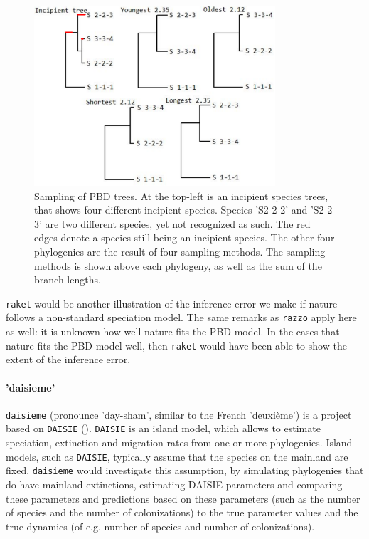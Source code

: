 \begin{figure}[]
  \includegraphics[width=0.8\textwidth]{raket_sampling_methods_modified.png}
  \caption{
    Sampling of PBD trees. At the top-left is an incipient species
    trees, that shows four different incipient species. Species
    'S2-2-2' and 'S2-2-3' are two different species, yet not recognized
    as such. The red edges denote a species still being an incipient
    species. The other four phylogenies are the result of four sampling
    methods. The sampling methods is shown above each phylogeny,
    as well as the sum of the branch lengths.
  }
  \label{fig:pbd_sampling}
\end{figure}

\verb;raket; would be another illustration of the inference error we make
if nature follows a non-standard speciation model. The same remarks as
\verb;razzo; apply here as well: it is unknown how well nature fits the PBD model.
In the cases that nature fits the PBD model well, then \verb;raket; would have
been able to show the extent of the inference error.

\paragraph{'daisieme'}

\verb;daisieme; (pronounce 'day-sham', similar to the French 'deuxième') is
a project based on \verb;DAISIE; (\cite{daisie}). \verb;DAISIE; is an island model,
which allows to estimate speciation, extinction and migration rates 
from one or more phylogenies. Island models, such as \verb;DAISIE;, typically
assume that the species on the mainland are fixed. \verb;daisieme; would
investigate this assumption, by simulating phylogenies that do have
mainland extinctions, estimating DAISIE parameters and comparing these parameters and predictions based on these parameters (such as the number of species and the number of colonizations) to the true parameter values and the true dynamics (of e.g. number of species and number of colonizations).

